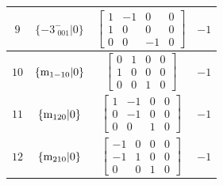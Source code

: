 \documentclass[fleqn,8pt]{jsarticle}
\begin{document}
\begin{longtable}{cccc}
$ 9 $ & $ \{-3^{-}_{\,\,001}|0\} $ & $ \begin{bmatrix} 1 & -1 & 0 & 0 \\ 1 & 0 & 0 & 0 \\ 0 & 0 & -1 & 0 \end{bmatrix} $ & $ -1 $ \\ \hline
$ 10 $ & $ \{{\rm m}_{1-10}|0\} $ & $ \begin{bmatrix} 0 & 1 & 0 & 0 \\ 1 & 0 & 0 & 0 \\ 0 & 0 & 1 & 0 \end{bmatrix} $ & $ -1 $ \\ \hline
$ 11 $ & $ \{{\rm m}_{120}|0\} $ & $ \begin{bmatrix} 1 & -1 & 0 & 0 \\ 0 & -1 & 0 & 0 \\ 0 & 0 & 1 & 0 \end{bmatrix} $ & $ -1 $ \\ \hline
$ 12 $ & $ \{{\rm m}_{210}|0\} $ & $ \begin{bmatrix} -1 & 0 & 0 & 0 \\ -1 & 1 & 0 & 0 \\ 0 & 0 & 1 & 0 \end{bmatrix} $ & $ -1 $ \\
\end{longtable}
\end{document}
